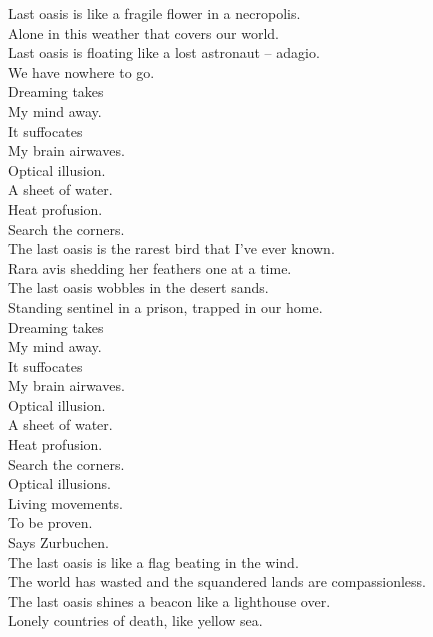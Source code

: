 Last oasis is like a fragile flower in a necropolis. \\
Alone in this weather that covers our world. \\
Last oasis is floating like a lost astronaut -- adagio. \\
We have nowhere to go. \\

Dreaming takes \\
My mind away. \\
It suffocates \\
My brain airwaves. \\

Optical illusion. \\
A sheet of water. \\
Heat profusion. \\
Search the corners. \\

The last oasis is the rarest bird that I've ever known. \\
Rara avis shedding her feathers one at a time. \\
The last oasis wobbles in the desert sands. \\
Standing sentinel in a prison, trapped in our home. \\

Dreaming takes \\
My mind away. \\
It suffocates \\
My brain airwaves. \\

Optical illusion. \\
A sheet of water. \\
Heat profusion. \\
Search the corners. \\

Optical illusions. \\
Living movements. \\
To be proven. \\
Says Zurbuchen. \\

The last oasis is like a flag beating in the wind. \\
The world has wasted and the squandered lands are compassionless. \\
The last oasis shines a beacon like a lighthouse over. \\
Lonely countries of death, like yellow sea. \\


